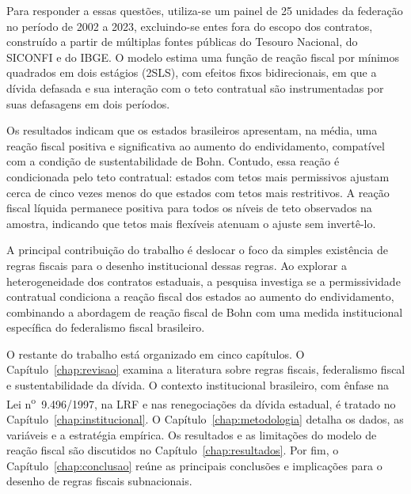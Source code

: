 Para responder a essas questões, utiliza-se um painel de 25 unidades da federação no período de 2002 a 2023, excluindo-se entes fora do escopo dos contratos, construído a partir de múltiplas fontes públicas do Tesouro Nacional, do SICONFI e do IBGE. O modelo estima uma função de reação fiscal por mínimos quadrados em dois estágios (2SLS), com efeitos fixos bidirecionais, em que a dívida defasada e sua interação com o teto contratual são instrumentadas por suas defasagens em dois períodos. 

Os resultados indicam que os estados brasileiros apresentam, na média, uma reação fiscal positiva e significativa ao aumento do endividamento, compatível com a condição de sustentabilidade de Bohn. Contudo, essa reação é condicionada pelo teto contratual: estados com tetos mais permissivos ajustam cerca de cinco vezes menos do que estados com tetos mais restritivos. A reação fiscal líquida permanece positiva para todos os níveis de teto observados na amostra, indicando que tetos mais flexíveis atenuam o ajuste sem invertê-lo.

A principal contribuição do trabalho é deslocar o foco da simples existência de regras fiscais para o desenho institucional dessas regras. Ao explorar a heterogeneidade dos contratos estaduais, a pesquisa investiga se a permissividade contratual condiciona a reação fiscal dos estados ao aumento do endividamento, combinando a abordagem de reação fiscal de Bohn com uma medida institucional específica do federalismo fiscal brasileiro.

O restante do trabalho está organizado em cinco capítulos. O Capítulo~\ref{chap:revisao} examina a literatura sobre regras fiscais, federalismo fiscal e sustentabilidade da dívida. O contexto institucional brasileiro, com ênfase na Lei n\textsuperscript{o}~9.496/1997, na LRF e nas renegociações da dívida estadual, é tratado no Capítulo~\ref{chap:institucional}. O Capítulo~\ref{chap:metodologia} detalha os dados, as variáveis e a estratégia empírica. Os resultados e as limitações do modelo de reação fiscal são discutidos no Capítulo~\ref{chap:resultados}. Por fim, o Capítulo~\ref{chap:conclusao} reúne as principais conclusões e implicações para o desenho de regras fiscais subnacionais.